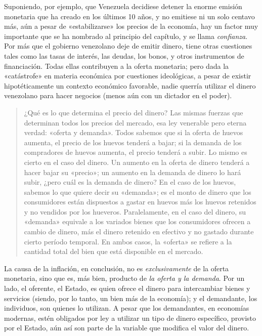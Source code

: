 \documentclass[12pt,a4paper,twoside]{book}
\begin{document}
Suponiendo, por ejemplo, que Venezuela decidiese detener la enorme emisión monetaria que ha creado en los últimos 10 años, y no emitiese ni un solo centavo más, aún a pesar de «estabilizarse» los precios de la economía, hay un factor muy importante que se ha nombrado al principio del capítulo, y se llama \textit{confianza}. Por más que el gobierno venezolano deje de emitir dinero, tiene otras cuestiones tales como las tasas de interés, las deudas, los bonos, y otros instrumentos de financiación. Todas ellas contribuyen a la oferta monetaria; pero dada la «catástrofe» en materia económica por cuestiones ideológicas, a pesar de existir hipotéticamente un contexto económico favorable, nadie querría utilizar el dinero venezolano para hacer negocios (menos aún con un dictador en el poder).

\begin{quotation}
¿Qué es lo que determina el precio del dinero? Las mismas fuerzas que determinan todos los precios del mercado, esa ley venerable pero eterna verdad: «oferta y demanda». Todos sabemos que si la oferta de huevos aumenta, el precio de los huevos tenderá a bajar; si la demanda de los compradores de huevos aumenta, el precio tenderá a subir. Lo mismo es cierto en el caso del dinero. Un aumento en la oferta de dinero tenderá a hacer bajar su «precio»; un aumento en la demanda de dinero lo hará subir, ¿pero cuál es la demanda de dinero? En el caso de los huevos, sabemos lo que quiere decir su «demanda»; es el monto de dinero que los consumidores están dispuestos a gastar en huevos más los huevos retenidos y no vendidos por los hueveros. Paralelamente, en el caso del dinero, su «demanda» equivale a los variados bienes que los consumidores ofrecen a cambio de dinero, más el dinero retenido en efectivo y no gastado durante cierto período temporal. En ambos casos, la «oferta» se refiere a la cantidad total del bien que está disponible en el mercado. \cite[págs. 22-23]{rothbard:dinero}
\end{quotation}

La causa de la inflación, en conclusión, no es \textit{exclusivamente} de la oferta monetaria, sino que es, más bien, producto de \textit{la oferta y la demanda}. Por un lado, el oferente, el Estado, es quien ofrece el dinero para intercambiar bienes y servicios (siendo, por lo tanto, un bien más de la economía); y el demandante, los individuos, son quienes lo utilizan. A pesar que los demandantes, en economías modernas, estén obligados por ley a utilizar un tipo de dinero específico, provisto por el Estado, aún así son parte de la variable que modifica el valor del dinero.
\end{document}

